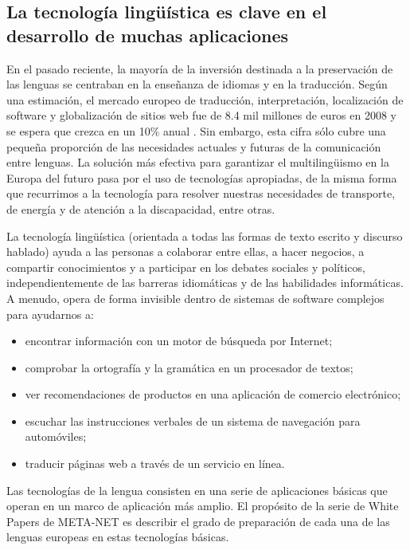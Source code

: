 \begin{multicols}{2}
\subsection{La tecnología lingüística es clave en el desarrollo de muchas aplicaciones}

En el pasado reciente, la mayoría de la inversión destinada a la preservación de las lenguas se centraban en la enseñanza de idiomas y en la traducción. Según una estimación, el mercado europeo de traducción, interpretación, localización de software y globalización de sitios web fue de 8.4 mil millones de euros en 2008 y se espera que crezca en un 10\% anual \cite{EC3}. Sin embargo, esta cifra sólo cubre una pequeña proporción de las necesidades actuales y futuras de la comunicación entre lenguas. La solución más efectiva para garantizar el multilingüismo en la Europa del futuro pasa por el uso de tecnologías apropiadas, de la misma forma que recurrimos a la tecnología para resolver nuestras necesidades de transporte, de energía y de atención a la discapacidad, entre otras.

La tecnología lingüística (orientada a todas las formas de texto escrito y discurso hablado) ayuda a las personas a colaborar entre ellas, a hacer negocios, a compartir conocimientos y a participar en los debates sociales y políticos, independientemente de las barreras idiomáticas y de las habilidades informáticas. A menudo, opera de forma invisible dentro de sistemas de software complejos para ayudarnos a:

\begin{itemize}
  \item	encontrar información con un motor de búsqueda por Internet;
  \item	comprobar la ortografía y la gramática en un procesador de textos;
  \item	ver recomendaciones de productos en una aplicación de comercio electrónico;
  \item	escuchar las instrucciones verbales de un sistema de navegación para automóviles;
  \item	traducir páginas web a través de un servicio en línea. 
\end{itemize}

Las tecnologías de la lengua consisten en una serie de aplicaciones básicas que operan en un marco de aplicación más amplio. El propósito de la serie de White Papers de META-NET es describir el grado de preparación de cada una de las lenguas europeas en estas tecnologías básicas. 


\end{multicols}
